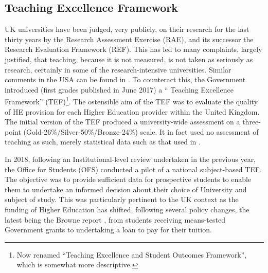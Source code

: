 \documentclass[sigconf,anonymous]{acmart}
\begin{document}
\subsection{Teaching Excellence Framework}

UK universities have been judged, very publicly, on their research for
the last thirty years by the Research Assessment Exercise (RAE), and
its successor the Research Evaluation Framework (REF). This has led to
many complaints, largely justified, that teaching, because it is not
measured, is not taken as seriously as research, certainly in some of
the research-intensive universities. Similar comments in the USA can
be found in \cite{Campbelletal2018a}. To counteract this, the
Government introduced (first grades published in June 2017) a ``
Teaching Excellence Framework'' (TEF)\footnote{Now renamed ``Teaching
Excellence and Student Outcomes Framework'', which is somewhat more
descriptive.}. The ostensible aim of the TEF was to evaluate the
quality of HE provision for each Higher Education provider within the
United Kingdom.  The initial version of the TEF produced a
university-wide assessment on a three-point
(Gold-26\%/Silver-50\%/Bronze-24\%) scale. It in fact used no
assessment of teaching as such, merely statistical data such as that
used in \cite{Shadbolt2016a}.

In 2018, following an Institutional-level review undertaken in the
previous year, the Office for Students (OFS) conducted a pilot of a
national subject-based TEF. The objective was to provide sufficient
data for prospective students to enable them to undertake an informed
decision about their choice of University and subject of study. This
was particularly pertinent to the UK context as the funding of Higher
Education has shifted, following several policy changes, the latest
being the Browne report \cite{BIS2010a}, from students receiving
means-tested Government grants to undertaking a loan to pay for their
tuition.
\end{document}
